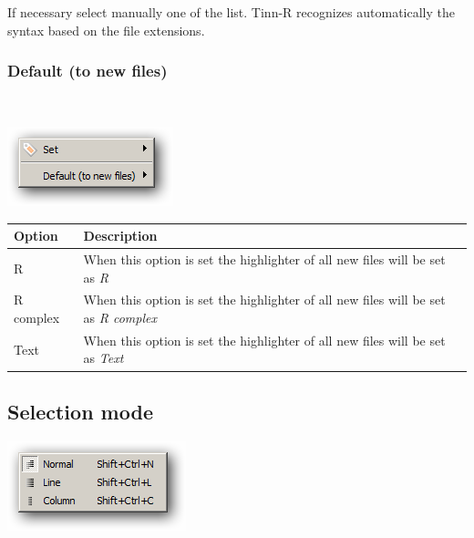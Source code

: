 If necessary select manually one of the list. Tinn-R recognizes
automatically the syntax based on the file extensions.


\hypertarget{menu_options_syntax_default}{}
\subsubsection{Default (to new files)}\\

\includegraphics[scale=0.50]{./res/menu_options_syntax.png}\\

\begin{scriptsize}\begin{tabularx}{\textwidth}{>{\hsize=0.2\hsize}X>{\hsize=0.8\hsize}X}\\
    \hline
    \textbf{Option} & \textbf{Description} \\
    \hline
    R & When this option is set the highlighter of all new files will be set as \textit{R} \\
    R complex & When this option is set the highlighter of all new files will be set as \textit{R complex} \\
    Text & When this option is set the highlighter of all new files will be set as \textit{Text} \\
    \hline
  \end{tabularx}\end{scriptsize}


\hypertarget{menu_options_selectionmode}{}
\subsection{Selection mode}

\includegraphics[scale=0.50]{./res/menu_options_selectionmode.png}\\

